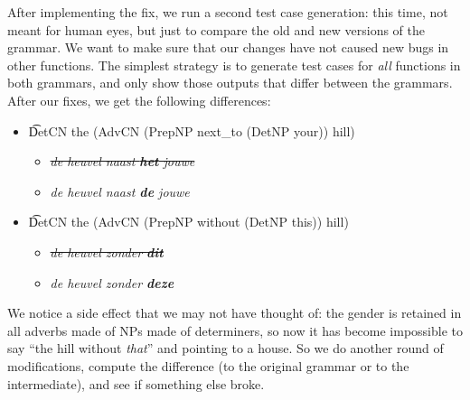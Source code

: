 After implementing the fix, we run a second test case generation: this
time, not meant for human eyes, but just to compare the old and new
versions of the grammar. We want to make sure that our changes 
have not caused new bugs in other functions. The simplest strategy is
to generate test cases for \emph{all} functions in both grammars, and
only show those outputs that differ between the grammars. After our
fixes, we get the following differences: 

\begin{itemize}
\item \t{DetCN the (AdvCN (PrepNP next\_to (DetNP your)) hill)}
  \begin{itemize}
   \item \emph{\sout{de heuvel naast {\bf  het} jouwe}}
   \item \emph{de heuvel naast {\bf  de} jouwe}
  \end{itemize}
\item \t{DetCN the (AdvCN (PrepNP without (DetNP this)) hill)}
  \begin{itemize}
   \item \emph{\sout{de heuvel zonder {\bf  dit}}}
   \item \emph{de heuvel zonder {\bf  deze}}
  \end{itemize}
\end{itemize}

\noindent We notice a side effect that we may not have thought of: the
gender is retained in all adverbs made of NPs made of determiners, so
now it has become impossible to say ``the hill without \emph{that}'' and
pointing to a house. So we do another round of modifications, compute
the difference (to the original grammar or to the intermediate), and
see if something else broke.



